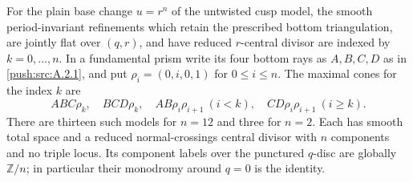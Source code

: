 \begin{proposition}\label{push:src:B.2.1}\label{push:B21}
For the plain base change $u=r^n$ of the untwisted cusp
model, the smooth period-invariant refinements which
retain the prescribed bottom triangulation, are jointly
flat over $(q,r)$, and have reduced $r$-central divisor
are indexed by $k=0,\ldots,n$. In a fundamental prism
write its four bottom rays as $A,B,C,D$ as in \ref{push:src:A.2.1},
and put $\rho_i=(0,i,0,1)$ for $0\leq i\leq n$.
The maximal cones for the index $k$ are
\[
 ABC\rho_k,\quad BCD\rho_k,\quad
 AB\rho_i\rho_{i+1}\ (i<k),\quad
 CD\rho_i\rho_{i+1}\ (i\geq k).
\]
There are thirteen such models for $n=12$ and three
for $n=2$. Each has smooth total space and a reduced
normal-crossings central divisor with $n$ components
and no triple locus. Its component labels over the
punctured $q$-disc are globally $\mathbb Z/n$; in
particular their monodromy around $q=0$ is the identity.
\end{proposition}

